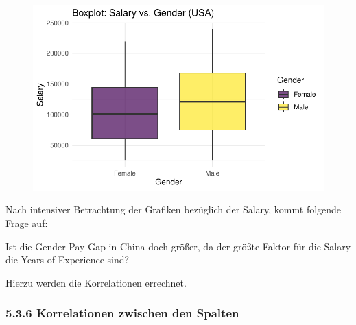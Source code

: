 \documentclass[
  letterpaper,
  DIV=11,
  numbers=noendperiod]{scrartcl}
\newenvironment{Shaded}{\begin{snugshade}}{\end{snugshade}}
\newcommand{\FunctionTok}[1]{\textcolor[rgb]{0.28,0.35,0.67}{#1}}
\newcommand{\NormalTok}[1]{\textcolor[rgb]{0.00,0.23,0.31}{#1}}
\newcommand{\OtherTok}[1]{\textcolor[rgb]{0.00,0.23,0.31}{#1}}
\newcommand{\SpecialCharTok}[1]{\textcolor[rgb]{0.37,0.37,0.37}{#1}}
\newcommand{\StringTok}[1]{\textcolor[rgb]{0.13,0.47,0.30}{#1}}
\begin{document}
\begin{figure}[H]

{\centering \includegraphics{main_doc_files/figure-pdf/unnamed-chunk-57-1.pdf}

}

\end{figure}

Nach intensiver Betrachtung der Grafiken bezüglich der Salary, kommt
folgende Frage auf:

Ist die Gender-Pay-Gap in China doch größer, da der größte Faktor für
die Salary die Years of Experience sind?

Hierzu werden die Korrelationen errechnet.

\hypertarget{korrelationen-zwischen-den-spalten}{%
\subsubsection{5.3.6 Korrelationen zwischen den
Spalten}\label{korrelationen-zwischen-den-spalten}}

\begin{Shaded}
\end{Shaded}
\end{document}
